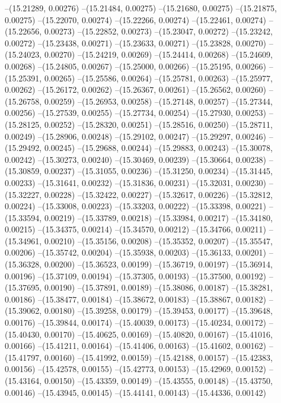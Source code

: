 --(15.21289, 0.00276)
--(15.21484, 0.00275)
--(15.21680, 0.00275)
--(15.21875, 0.00275)
--(15.22070, 0.00274)
--(15.22266, 0.00274)
--(15.22461, 0.00274)
--(15.22656, 0.00273)
--(15.22852, 0.00273)
--(15.23047, 0.00272)
--(15.23242, 0.00272)
--(15.23438, 0.00271)
--(15.23633, 0.00271)
--(15.23828, 0.00270)
--(15.24023, 0.00270)
--(15.24219, 0.00269)
--(15.24414, 0.00268)
--(15.24609, 0.00268)
--(15.24805, 0.00267)
--(15.25000, 0.00266)
--(15.25195, 0.00266)
--(15.25391, 0.00265)
--(15.25586, 0.00264)
--(15.25781, 0.00263)
--(15.25977, 0.00262)
--(15.26172, 0.00262)
--(15.26367, 0.00261)
--(15.26562, 0.00260)
--(15.26758, 0.00259)
--(15.26953, 0.00258)
--(15.27148, 0.00257)
--(15.27344, 0.00256)
--(15.27539, 0.00255)
--(15.27734, 0.00254)
--(15.27930, 0.00253)
--(15.28125, 0.00252)
--(15.28320, 0.00251)
--(15.28516, 0.00250)
--(15.28711, 0.00249)
--(15.28906, 0.00248)
--(15.29102, 0.00247)
--(15.29297, 0.00246)
--(15.29492, 0.00245)
--(15.29688, 0.00244)
--(15.29883, 0.00243)
--(15.30078, 0.00242)
--(15.30273, 0.00240)
--(15.30469, 0.00239)
--(15.30664, 0.00238)
--(15.30859, 0.00237)
--(15.31055, 0.00236)
--(15.31250, 0.00234)
--(15.31445, 0.00233)
--(15.31641, 0.00232)
--(15.31836, 0.00231)
--(15.32031, 0.00230)
--(15.32227, 0.00228)
--(15.32422, 0.00227)
--(15.32617, 0.00226)
--(15.32812, 0.00224)
--(15.33008, 0.00223)
--(15.33203, 0.00222)
--(15.33398, 0.00221)
--(15.33594, 0.00219)
--(15.33789, 0.00218)
--(15.33984, 0.00217)
--(15.34180, 0.00215)
--(15.34375, 0.00214)
--(15.34570, 0.00212)
--(15.34766, 0.00211)
--(15.34961, 0.00210)
--(15.35156, 0.00208)
--(15.35352, 0.00207)
--(15.35547, 0.00206)
--(15.35742, 0.00204)
--(15.35938, 0.00203)
--(15.36133, 0.00201)
--(15.36328, 0.00200)
--(15.36523, 0.00199)
--(15.36719, 0.00197)
--(15.36914, 0.00196)
--(15.37109, 0.00194)
--(15.37305, 0.00193)
--(15.37500, 0.00192)
--(15.37695, 0.00190)
--(15.37891, 0.00189)
--(15.38086, 0.00187)
--(15.38281, 0.00186)
--(15.38477, 0.00184)
--(15.38672, 0.00183)
--(15.38867, 0.00182)
--(15.39062, 0.00180)
--(15.39258, 0.00179)
--(15.39453, 0.00177)
--(15.39648, 0.00176)
--(15.39844, 0.00174)
--(15.40039, 0.00173)
--(15.40234, 0.00172)
--(15.40430, 0.00170)
--(15.40625, 0.00169)
--(15.40820, 0.00167)
--(15.41016, 0.00166)
--(15.41211, 0.00164)
--(15.41406, 0.00163)
--(15.41602, 0.00162)
--(15.41797, 0.00160)
--(15.41992, 0.00159)
--(15.42188, 0.00157)
--(15.42383, 0.00156)
--(15.42578, 0.00155)
--(15.42773, 0.00153)
--(15.42969, 0.00152)
--(15.43164, 0.00150)
--(15.43359, 0.00149)
--(15.43555, 0.00148)
--(15.43750, 0.00146)
--(15.43945, 0.00145)
--(15.44141, 0.00143)
--(15.44336, 0.00142)
